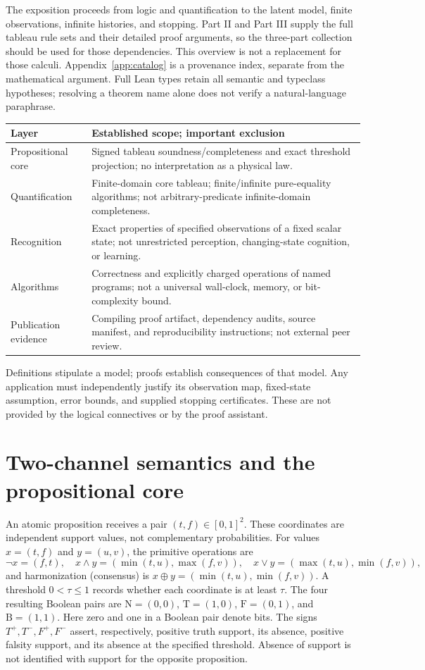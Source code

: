 \documentclass[11pt,a4paper]{article}
\begin{document}
The exposition proceeds from logic and quantification to the latent model,
finite observations, infinite histories, and stopping. Part II and Part III
supply the full tableau rule sets and their detailed proof arguments, so the
three-part collection should be used for those dependencies. This overview
is not a replacement for those calculi. Appendix~\ref{app:catalog} is a
provenance index, separate from the mathematical argument. Full Lean types
retain all semantic and typeclass hypotheses; resolving a theorem name alone
does not verify a natural-language paraphrase.

\begin{center}\small
\begin{tabular}{p{.26\linewidth}p{.64\linewidth}}
\toprule
Layer & Established scope; important exclusion\\\midrule
Propositional core & Signed tableau soundness/completeness and exact threshold
projection; no interpretation as a physical law.\\
Quantification & Finite-domain core tableau; finite/infinite pure-equality
algorithms; not arbitrary-predicate infinite-domain completeness.\\
Recognition & Exact properties of specified observations of a fixed scalar
state; not unrestricted perception, changing-state cognition, or learning.\\
Algorithms & Correctness and explicitly charged operations of named programs;
not a universal wall-clock, memory, or bit-complexity bound.\\
Publication evidence & Compiling proof artifact, dependency audits, source
manifest, and reproducibility instructions; not external peer review.\\
\bottomrule
\end{tabular}
\end{center}

Definitions stipulate a model; proofs establish consequences of that model.
Any application must independently justify its observation map, fixed-state
assumption, error bounds, and supplied stopping certificates. These are not
provided by the logical connectives or by the proof assistant.

\section{Two-channel semantics and the propositional core}
An atomic proposition receives a pair $(t,f)\in[0,1]^2$. These coordinates
are independent support values, not complementary probabilities. For values
$x=(t,f)$ and $y=(u,v)$, the primitive operations are
\[
 \neg x=(f,t),\quad x\wedge y=(\min(t,u),\max(f,v)),\quad
 x\vee y=(\max(t,u),\min(f,v)),
\]
and harmonization (consensus) is $x\oplus y=(\min(t,u),\min(f,v))$.
A threshold $0<\tau\le1$ records whether each coordinate is at least $\tau$.
The four resulting Boolean pairs are $\mathrm{N}=(0,0)$, $\mathrm{T}=(1,0)$,
$\mathrm{F}=(0,1)$, and $\mathrm{B}=(1,1)$. Here zero and one in a Boolean
pair denote bits. The signs $T^+,T^-,F^+,F^-$ assert, respectively, positive
truth support, its absence, positive falsity support, and its absence at the
specified threshold. Absence of support is not identified with support for
the opposite proposition.
\end{document}
